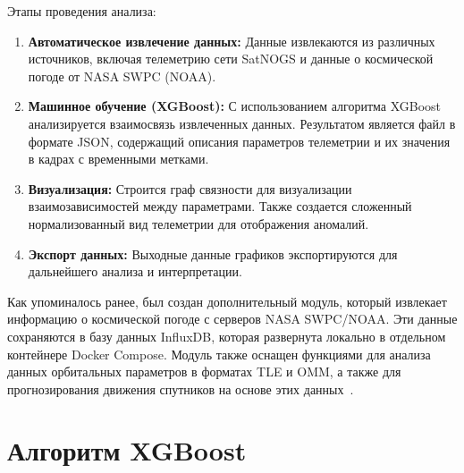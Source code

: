 \documentclass[14pt, a4paper]{../cls/coursework}
\begin{document}
    Этапы проведения анализа:

    \begin{enumerate}[label=\arabic*.]
        \item \textbf{Автоматическое извлечение данных:}
        Данные извлекаются из различных источников, включая телеметрию сети SatNOGS и данные о космической погоде от NASA SWPC (NOAA).

        \item \textbf{Машинное обучение (XGBoost):}
        С использованием алгоритма XGBoost~\cite{xgboost_docs,boumghar_2018_enhanced} анализируется взаимосвязь извлеченных данных.
        Результатом является файл в формате JSON, содержащий описания параметров телеметрии и их значения в кадрах с временными метками.

        \item \textbf{Визуализация:}
        Строится граф связности для визуализации взаимозависимостей между параметрами.
        Также создается сложенный нормализованный вид телеметрии для отображения аномалий.

        \item \textbf{Экспорт данных:}
        Выходные данные графиков экспортируются для дальнейшего анализа и интерпретации.
    \end{enumerate}

    Как упоминалось ранее, был создан дополнительный модуль, который извлекает информацию о космической погоде с серверов NASA SWPC/NOAA. Эти данные сохраняются в базу данных InfluxDB, которая развернута локально в отдельном контейнере Docker Compose.
    Модуль также оснащен функциями для анализа данных орбитальных параметров в форматах TLE и OMM, а также для прогнозирования движения спутников на основе этих данных~\cite{bottou_1991_stochastic,killick_2012_optimal}.

    \section{Алгоритм XGBoost}
\end{document}
